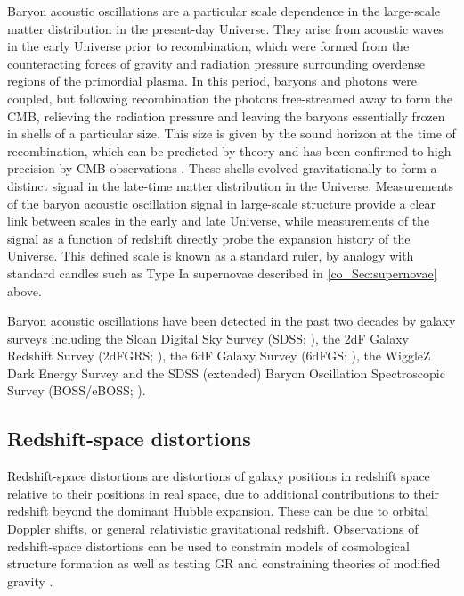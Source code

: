 Baryon acoustic oscillations are a particular scale dependence in the large-scale matter distribution in the present-day Universe. They arise from acoustic waves in the early Universe prior to recombination, which were formed from the counteracting forces of gravity and radiation pressure surrounding overdense regions of the primordial plasma. In this period, baryons and photons were coupled, but following recombination the photons free-streamed away to form the CMB, relieving the radiation pressure and leaving the baryons essentially frozen in shells of a particular size. This size is given by the sound horizon at the time of recombination, which can be predicted by theory and has been confirmed to high precision by CMB observations \citep{Planck2018I}. These shells evolved gravitationally to form a distinct signal in the late-time matter distribution in the Universe. Measurements of the baryon acoustic oscillation signal in large-scale structure provide a clear link between scales in the early and late Universe, while measurements of the signal as a function of redshift directly probe the expansion history of the Universe. This defined scale is known as a standard ruler, by analogy with standard candles such as Type Ia supernovae described in \autoref{co_Sec:supernovae} above.

Baryon acoustic oscillations have been detected in the past two decades by galaxy surveys including the Sloan Digital Sky Survey (SDSS; \citealt{Eisenstein2005, Percival2010}), the 2dF Galaxy Redshift Survey (2dFGRS; \citealt{Cole2005}), the 6dF Galaxy Survey (6dFGS; \citealt{Beutler2011}), the WiggleZ Dark Energy Survey \citep{Blake2011, Kazin2014} and the SDSS (extended) Baryon Oscillation Spectroscopic Survey (BOSS/eBOSS; \citealt{Anderson2012, Anderson2014, Delubac2015, deSainteAgathe2019, Blomqvist2019}).

\subsection{Redshift-space distortions}

Redshift-space distortions are distortions of galaxy positions in redshift space relative to their positions in real space, due to additional contributions to their redshift beyond the dominant Hubble expansion. These can be due to orbital Doppler shifts, or general relativistic gravitational redshift. Observations of redshift-space distortions can be used to constrain models of cosmological structure formation \citep{Percival2009, Macaulay2013, Howlett2015} as well as testing GR and constraining theories of modified gravity \citep{Beutler2014, Percival2011, Raccanelli2013}.

